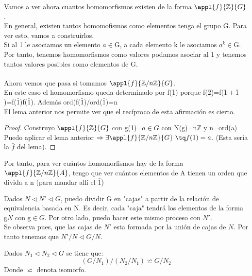\documentclass{apuntes}
\begin{document}
Vamos a ver ahora cuantos homomorfismos existen de la forma $\appl{f}{\mathbb{Z}}{G}$.\\
En general, existen tantos homomofismos como elementos tenga el grupo G. Para ver esto, vamos a construirlos.\\
Si al 1 le asociamos un elemento $a \in$G, a cada elemento k le asociamos $a^{k}\in$G. Por tanto, tenemos homomorfismos como valores
podamos asociar al 1 y tenemos tantos valores posibles como elementos de G.\\
\\
Ahora vemos que pasa si tomamos $\appl{f}{\mathbb{Z}/n\mathbb{Z}}{G}$. \\
En este caso el homomorfismo queda determinado por f($\bar{1}$) porque
f($\bar{2}$)=f($\bar{1}+\bar{1}$)=f($\bar{1}$)f($\bar{1}$). Además ord(f($\bar{1}$)/ord($\bar{1}$)=n\\
El lema anterior nos permite ver que el recíproco de esta afirmación es cierto.\\
\begin{proof}
Construyo $\appl{f}{\mathbb{Z}}{G}$  con g(1)=$a\in G$ con N(g)=n$\mathbb{Z}$  y n=ord(a)
Puedo aplicar el lema anterior $\Rightarrow \exists \appl{f}{\mathbb{Z}/n\mathbb{Z}}{G} \ \tq f(1)=a$. (Esta sería la $\bar{f}$ del lema).
\end{proof}

Por tanto, para ver cuántos homomorfismos hay de la forma $\appl{f}{\mathbb{Z}/n\mathbb{Z}}{A}$, tengo que ver cuántos elementos
de A tienen un orden que divida a n (para mandar allí el $\bar{1}$)\\

\begin{lemma}
 Dados $N\vartriangleleft N' \vartriangleleft G$, puedo dividir G en "cajas" a partir de la relación de equivalencia basada en N. Es decir,
cada "caja" tendrá los elementos de la forma g$N$  con g$\in G$. Por otro lado, puedo hacer este mismo proceso con $N'$.\\
Se observa pues, que las cajas de $N'$  esta formada por la unión de cajas de $N$. Por tanto tenemos que $N'/N \vartriangleleft G/N$.\\
\end{lemma}

\begin{theorem}
 Dados $N_1\vartriangleleft N_2 \vartriangleleft G$  se tiene que:
 \[ (G/N_1)/(N_2/N_1)\backsimeq G/N_2\]
 Donde $\backsimeq$  denota isomorfo.
\end{theorem}
\end{document}
